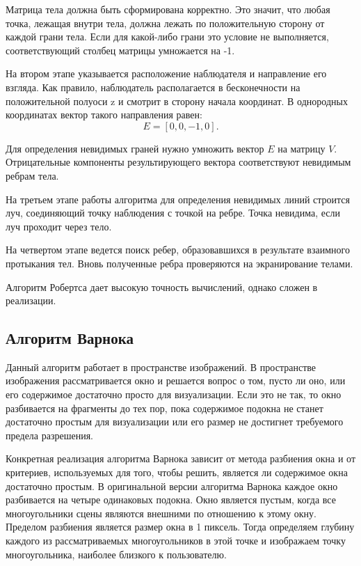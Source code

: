 Матрица тела должна быть сформирована корректно. Это значит, что любая
точка, лежащая внутри тела, должна лежать по положительную сторону от каждой
грани тела. Если для какой-либо грани это условие не выполняется,
соответствующий столбец матрицы умножается на -1.

На втором этапе указывается расположение наблюдателя и направление его
взгляда. Как правило, наблюдатель располагается в бесконечности на
положительной полуоси z и смотрит в сторону начала координат. В однородных
координатах вектор такого направления равен:
$$
	E = [0, 0, -1, 0].
$$

Для определения невидимых граней нужно умножить вектор $E$ на матрицу $V$. Отрицательные компоненты результирующего вектора соответствуют
невидимым ребрам тела.

На третьем этапе работы алгоритма для определения невидимых линий
строится луч, соединяющий точку наблюдения с точкой на ребре. Точка невидима,
если луч проходит через тело.

На четвертом этапе ведется поиск ребер, образовавшихся в результате
взаимного протыкания тел. Вновь полученные ребра проверяются на
экранирование телами.

Алгоритм Робертса дает высокую точность вычислений, однако сложен в
реализации.

\subsection{Алгоритм Варнока}

Данный алгоритм работает в пространстве изображений. В пространстве
изображения рассматривается окно и решается вопрос о том, пусто ли оно, или его
содержимое достаточно просто для визуализации. Если это не так, то окно
разбивается на фрагменты до тех пор, пока содержимое подокна не станет достаточно простым для визуализации или его размер не достигнет требуемого
предела разрешения.

Конкретная реализация алгоритма Варнока зависит от метода разбиения
окна и от критериев, используемых для того, чтобы решить, является ли
содержимое окна достаточно простым. В оригинальной версии алгоритма Варнока
каждое окно разбивается на четыре одинаковых подокна. Окно является пустым,
когда все многоугольники сцены являются внешними по отношению к этому окну.
Пределом разбиения является размер окна в 1 пиксель. Тогда определяем глубину
каждого из рассматриваемых многоугольников в этой точке и изображаем точку
многоугольника, наиболее близкого к пользователю.

